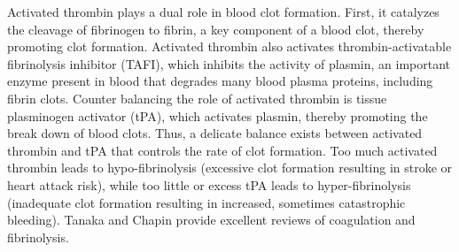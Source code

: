\documentclass[11pt]{article}
\begin{document}
Activated thrombin plays a dual role in blood clot formation.
First, it catalyzes the cleavage of fibrinogen to fibrin, a key component of a blood clot, thereby promoting clot formation.
Activated thrombin also activates thrombin-activatable fibrinolysis inhibitor (TAFI), which inhibits the activity of plasmin, an important enzyme present in blood that degrades many blood plasma proteins, including fibrin clots.
Counter balancing the role of activated thrombin is tissue plasminogen activator (tPA), which activates plasmin, thereby promoting the break down of blood clots.
Thus, a delicate balance exists between activated thrombin and tPA that controls the rate of clot formation.
Too much activated thrombin leads to hypo-fibrinolysis (excessive clot formation resulting in stroke or heart attack risk),
while too little or excess tPA leads to hyper-fibrinolysis (inadequate clot formation resulting in increased, sometimes catastrophic bleeding).
Tanaka and Chapin \cite{Tanaka:2009wo,Chapin:2015aa} provide excellent reviews of coagulation and fibrinolysis.

\end{document}
